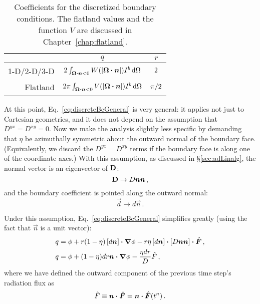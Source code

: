 \begin{table}[tb]
  \centering
  \begin{tabular}{rcc}
\toprule
& $q$
& $r$
\\ \midrule
1-D/2-D/3-D
& $2 \int_{\bm{\Omega}\bm{\cdot}\bm{n} < 0}
  W(\left| \bm{\Omega}\bm{\cdot}\bm{n} \right|) I^b \mathop{}\!\mathrm{d}\Omega$
  & $2\vphantom{\Big|}$
\\
Flatland
& $2 \pi \int_{\bm{\Omega}\bm{\cdot}\bm{n} < 0}
  V(\left| \bm{\Omega}\bm{\cdot}\bm{n} \right|) I^b \mathop{}\!\mathrm{d}\Omega$
& $\pi/2\vphantom{\Big|}$
\\ \bottomrule
  \end{tabular}
  \caption[Coefficients for the discretized boundary conditions.]{%
    Coefficients for the discretized boundary conditions. The flatland values
    and the function $V$ are discussed in Chapter~\ref{chap:flatland}. }
  \label{tab:discreteBcCoeffs}
\end{table}

At this point, Eq.~\eqref{eq:discreteBcGeneral} is very general: it applies not
just to Cartesian geometries, and it does not depend on the assumption that
$D^{yx}=D^{xy}=0$. Now we make the analysis slightly less specific by demanding
that $\eta$ be azimuthally symmetric about the outward normal of the boundary face.
(Equivalently, we discard the $D^{yx}=D^{xy}$ terms if the boundary face is
along one of the coordinate axes.) With this assumption, as discussed in
\S\ref{sec:adLinalg}, the normal vector is an eigenvector of $\mathbf{D}$:
\begin{equation*}
  \mathbf{D} \to D \bm{n}\bm{n}\,,
\end{equation*}
and the boundary coefficient is pointed along the outward normal:
\begin{equation*}
  \vec{d} \to d \vec{n}\,.
\end{equation*}

Under this assumption, Eq.~\eqref{eq:discreteBcGeneral} simplifies greatly
(using the fact that $\vec{n}$ is a unit vector):
\begin{align} \nonumber
  q &= \phi + r (1 - \eta) \left[ d \bm{n} \right] \bm{\cdot} \bm{\nabla} \phi
  - r \eta \left[ d \bm{n} \right] \bm{\cdot} \left[ D \bm{n}\bm{n} \right] \bm{\cdot}
  \hat{\bm{F}}\,,
  \\ \label{eq:discreteBcGeneralQ}
 q &=  \phi + (1 - \eta) dr \bm{n} \bm{\cdot} \bm{\nabla} \phi
  - \frac{\eta dr}{D} \hat{F} \,,
\end{align}
where we have defined the outward component of the previous time step's
radiation flux as
\begin{equation*}
  \hat{F} \equiv  \bm{n} \bm{\cdot} \hat{\bm{F}} = \bm{n} \bm{\cdot} \hat{\bm{F}}(t^n)\,.
\end{equation*}

